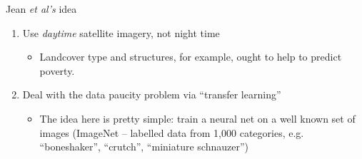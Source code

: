 \documentclass[mathserif, aspectratio=169]{beamer}
\begin{document}
\begin{frame}{Jean \textit{et al's} idea}
\begin{enumerate}
\item Use \textit{daytime }satellite imagery, not night time
\begin{itemize}
\item Landcover type and structures, for example, ought to help to predict poverty.
\end{itemize}
\item Deal with the data paucity problem via ``transfer learning''
\begin{itemize}
\item The idea here is pretty simple: train a neural net on a well known set of images (ImageNet -- labelled data from 1,000 categories, e.g. ``boneshaker'', ``crutch'', ``miniature schnauzer'')


\end{itemize}
\end{enumerate}
\end{frame}
\end{document}
